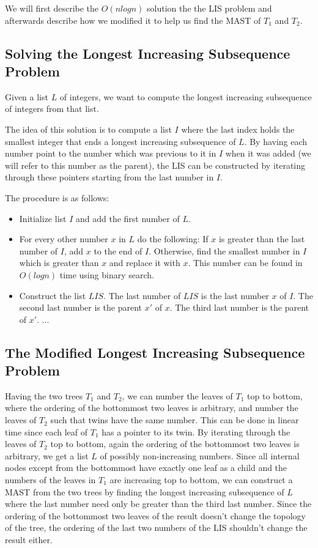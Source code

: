 We will first describe the $O(nlogn)$ solution the the LIS problem and afterwards describe how we modified it to help us find the MAST of $T_1$ and $T_2$.

\subsection{Solving the Longest Increasing Subsequence Problem}
Given a list $L$ of integers, we want to compute the longest increasing subsequence of integers from that list.


The idea of this solution is to compute a list $I$ where the last index holds the smallest integer that ends a longest increasing subsequence of $L$. By having each number point to the number which was previous to it in $I$ when it was added (we will refer to this number as the parent), the LIS can be constructed by iterating through these pointers starting from the last number in $I$.

The procedure is as follows:

\begin{itemize}
	\item Initialize list $I$ and add the first number of $L$.
	\item For every other number $x$ in $L$ do the following:
	\subitem If $x$ is greater than the last number of $I$, add $x$ to the end of $I$.
	\subitem Otherwise, find the smallest number in $I$ which is greater than $x$ and replace it with $x$. This number can be found in $O(logn)$ time using binary search.
	\item Construct the list $LIS$.
	\subitem The last number of $LIS$ is the last number $x$ of $I$.
	\subitem The second last number is the parent $x'$ of $x$.
	\subitem The third last number is the parent of $x'$.
	\subitem ...
\end{itemize}

\subsection{The Modified Longest Increasing Subsequence Problem}
\label{mlisSection}
Having the two trees $T_1$ and $T_2$, we can number the leaves of $T_1$ top to bottom, where the ordering of the bottommost two leaves is arbitrary, and number the leaves of $T_2$ such that twins have the same number. This can be done in linear time since each leaf of $T_1$ has a pointer to its twin. By iterating through the leaves of $T_2$ top to bottom, again the ordering of the bottommost two leaves is arbitrary, we get a list $L$ of possibly non-increasing numbers. Since all internal nodes except from the bottommost have exactly one leaf as a child and the numbers of the leaves in $T_1$ are increasing top to bottom, we can construct a MAST from the two trees by finding the longest increasing subsequence of $L$ where the last number need only be greater than the third last number. Since the ordering of the bottommost two leaves of the result doesn't change the topology of the tree, the ordering of the last two numbers of the LIS shouldn't change the result either.

